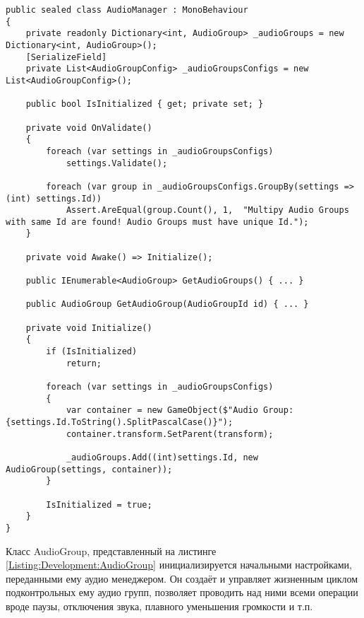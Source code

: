 \begin{lstlisting}[caption={Класс аудио менеджера}, label=Listing:Development:AudioManager]
public sealed class AudioManager : MonoBehaviour
{
    private readonly Dictionary<int, AudioGroup> _audioGroups = new Dictionary<int, AudioGroup>();
    [SerializeField]
    private List<AudioGroupConfig> _audioGroupsConfigs = new List<AudioGroupConfig>();

    public bool IsInitialized { get; private set; }

    private void OnValidate()
    {
        foreach (var settings in _audioGroupsConfigs)
            settings.Validate();

        foreach (var group in _audioGroupsConfigs.GroupBy(settings => (int) settings.Id))
            Assert.AreEqual(group.Count(), 1,  "Multipy Audio Groups with same Id are found! Audio Groups must have unique Id.");
    }

    private void Awake() => Initialize();

    public IEnumerable<AudioGroup> GetAudioGroups() { ... }

    public AudioGroup GetAudioGroup(AudioGroupId id) { ... }

    private void Initialize()
    {
        if (IsInitialized)
            return;

        foreach (var settings in _audioGroupsConfigs)
        {
            var container = new GameObject($"Audio Group: {settings.Id.ToString().SplitPascalCase()}");
            container.transform.SetParent(transform);

            _audioGroups.Add((int)settings.Id, new AudioGroup(settings, container));
        }

        IsInitialized = true;
    }
}
\end{lstlisting}

Класс AudioGroup, представленный на листинге \ref{Listing:Development:AudioGroup} инициализируется начальными настройками, переданными ему аудио менеджером. Он создаёт и управляет жизненным циклом подконтрольных ему аудио групп, позволяет проводить над ними всеми операции вроде паузы, отключения звука, плавного уменьшения громкости и т.п.

